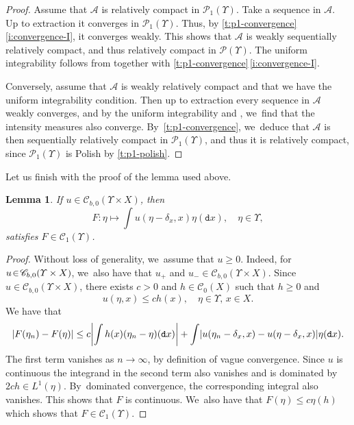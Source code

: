 \documentclass[JEP,XML,SOM,Unicode,published]{cedram}
\newtheorem{lemma}[theorem]{Lemma}
\theoremstyle{definition}
\theoremstyle{remark}
\DeclarePairedDelimiter{\abs}{\lvert}{\rvert}
\begin{document}
\begin{proof}
Assume that $\mathscr{A}$ is relatively compact in $\mathscr{P}_{1}(\varUpsilon)$.
Take a sequence in $\mathscr{A}$.
Up to extraction it converges in $\mathscr{P}_{1}(\varUpsilon)$.
Thus, by \cref{t:p1-convergence}\,\cref{i:convergence-I}, it converges weakly.
This shows that $\mathscr{A}$ is weakly sequentially relatively compact, and thus relatively compact in $\mathscr{P}(\varUpsilon)$.
The uniform integrability follows from \cite[Lem.\,5.11]{KallenbergFMP} together with \cref{t:p1-convergence}\,\cref{i:convergence-I}.

Conversely, assume that $\mathscr{A}$ is weakly relatively compact and that we have the uniform integrability condition.
Then up to extraction every sequence in $\mathscr{A}$ weakly converges, and by the uniform integrability and \cite[Lem.\,5.11]{KallenbergFMP}, we~find that the intensity measures also converge.
By~\cref{t:p1-convergence}, we~deduce that $\mathscr{A}$ is then sequentially relatively compact in $\mathscr{P}_{1}(\varUpsilon)$, and thus it is relatively compact, since $\mathscr{P}_{1}(\varUpsilon)$ is Polish by \cref{t:p1-polish}.
\end{proof}

Let us finish with the proof of the lemma used above.
\begin{lemma}\label{t:f-from-u-continuous}
If $u \in \mathscr{C}_{b,0}(\varUpsilon \times X)$, then
\begin{equation*}
F \colon \eta \longmapsto \int u(\eta - \delta_{x}, x) \eta(\mathtt{d} x), \quad \eta \in \varUpsilon,
\end{equation*}
satisfies $F \in \mathscr{C}_{1}(\varUpsilon)$.
\end{lemma}
\begin{proof}
Without loss of generality, we~assume that $u \!\geq\! 0$.
Indeed, for $u \!\in\! \mathscr{C}_{b,0}(\varUpsilon \times\nobreak X)$, we~also have that $u_{+}$ and $u_{-} \in \mathscr{C}_{b,0}(\varUpsilon \times X)$.
Since $u \in \mathscr{C}_{b,0}(\varUpsilon \times X)$, there exists $c > 0$ and $h \in \mathscr{C}_{0}(X)$ such that $h \geq 0$ and
\begin{equation*}
u(\eta, x) \leq c h(x), \quad \eta \in \varUpsilon,\, x \in X.
\end{equation*}
We have that
\begin{equation*}
\abs{F(\eta_{n}) - F(\eta)} \leq c \abs*{ \int h(x) (\eta_{n} - \eta)(\mathtt{d} x) } + \int \abs*{ u(\eta_{n} - \delta_{x}, x) - u(\eta - \delta_{x}, x) } \eta(\mathtt{d} x).
\end{equation*}
The first term vanishes as $n \to \infty$, by definition of vague convergence.
Since $u$ is continuous the integrand in the second term also vanishes and is dominated by $2c h \in L^{1}(\eta)$.
By~dominated convergence, the corresponding integral also vanishes.
This shows that $F$ is continuous. We~also have that $F(\eta) \leq c \eta(h)$ which shows that $F \in \mathscr{C}_{1}(\varUpsilon)$.
\end{proof}
\end{document}
